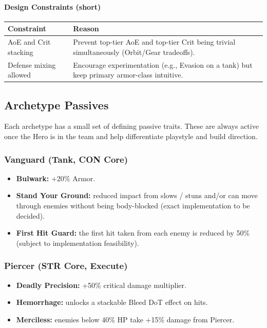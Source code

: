 \paragraph{Design Constraints (short)}
\begin{tabular}{l|p{11cm}}
	\textbf{Constraint} & \textbf{Reason} \\ \hline
	AoE and Crit stacking & Prevent top-tier AoE and top-tier Crit being trivial simultaneously (Orbit/Gear tradeoffs). \\
	Defense mixing allowed & Encourage experimentation (e.g., Evasion on a tank) but keep primary armor-class intuitive. \\
\end{tabular}

\subsection{Archetype Passives}

Each archetype has a small set of defining passive traits. 
These are always active once the Hero is in the team and help differentiate playstyle and build direction.

\subsubsection*{Vanguard (Tank, CON Core)}

\begin{itemize}
	\item \textbf{Bulwark:} +20\% Armor.
	\item \textbf{Stand Your Ground:} reduced impact from slows / stuns and/or can move through enemies without being body-blocked (exact implementation to be decided).
	\item \textbf{First Hit Guard:} the first hit taken from each enemy is reduced by 50\% (subject to implementation feasibility).
\end{itemize}

\subsubsection*{Piercer (STR Core, Execute)}

\begin{itemize}
	\item \textbf{Deadly Precision:} +50\% critical damage multiplier.
	\item \textbf{Hemorrhage:} unlocks a stackable Bleed DoT effect on hits.
	\item \textbf{Merciless:} enemies below 40\% HP take +15\% damage from Piercer.
\end{itemize}

